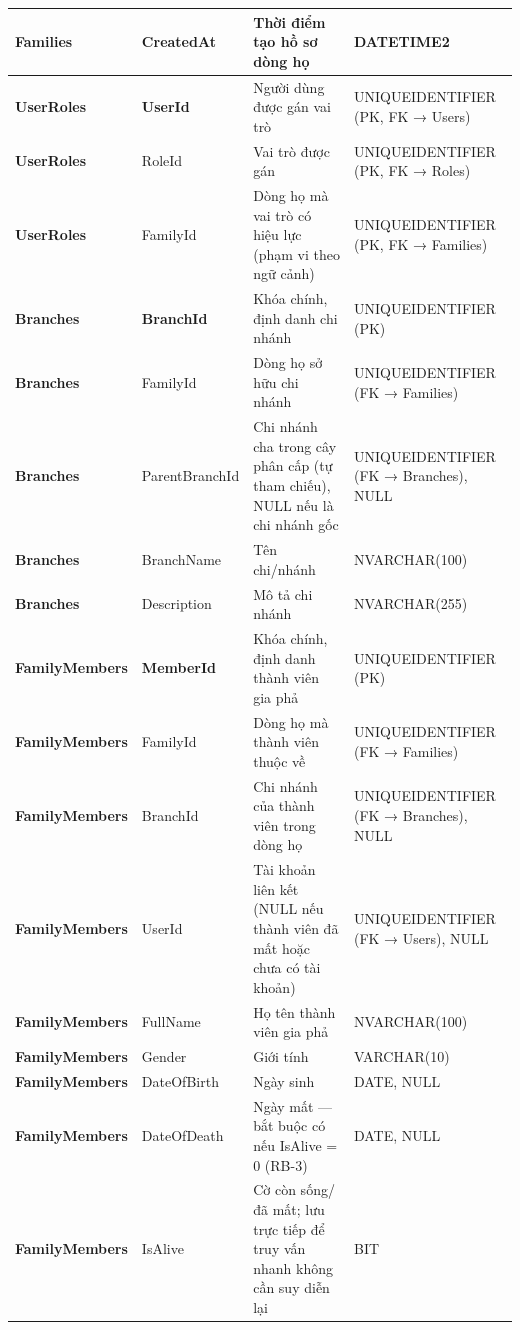 \begin{longtable}{|p{}|p{}|p{}|p{}|}
\textbf{Families} & CreatedAt & Thời điểm tạo hồ sơ dòng họ & DATETIME2 \\ \hline
\textbf{UserRoles} & \textbf{UserId} & Người dùng được gán vai trò & UNIQUEIDENTIFIER (PK, FK → Users) \\ \hline
\textbf{UserRoles} & RoleId & Vai trò được gán & UNIQUEIDENTIFIER (PK, FK → Roles) \\ \hline
\textbf{UserRoles} & FamilyId & Dòng họ mà vai trò có hiệu lực (phạm vi theo ngữ cảnh) & UNIQUEIDENTIFIER (PK, FK → Families) \\ \hline
\textbf{Branches} & \textbf{BranchId} & Khóa chính, định danh chi nhánh & UNIQUEIDENTIFIER (PK) \\ \hline
\textbf{Branches} & FamilyId & Dòng họ sở hữu chi nhánh & UNIQUEIDENTIFIER (FK → Families) \\ \hline
\textbf{Branches} & ParentBranchId & Chi nhánh cha trong cây phân cấp (tự tham chiếu), NULL nếu là chi nhánh gốc & UNIQUEIDENTIFIER (FK → Branches), NULL \\ \hline
\textbf{Branches} & BranchName & Tên chi/nhánh & NVARCHAR(100) \\ \hline
\textbf{Branches} & Description & Mô tả chi nhánh & NVARCHAR(255) \\ \hline
\textbf{FamilyMembers} & \textbf{MemberId} & Khóa chính, định danh thành viên gia phả & UNIQUEIDENTIFIER (PK) \\ \hline
\textbf{FamilyMembers} & FamilyId & Dòng họ mà thành viên thuộc về & UNIQUEIDENTIFIER (FK → Families) \\ \hline
\textbf{FamilyMembers} & BranchId & Chi nhánh của thành viên trong dòng họ & UNIQUEIDENTIFIER (FK → Branches), NULL \\ \hline
\textbf{FamilyMembers} & UserId & Tài khoản liên kết (NULL nếu thành viên đã mất hoặc chưa có tài khoản) & UNIQUEIDENTIFIER (FK → Users), NULL \\ \hline
\textbf{FamilyMembers} & FullName & Họ tên thành viên gia phả & NVARCHAR(100) \\ \hline
\textbf{FamilyMembers} & Gender & Giới tính & VARCHAR(10) \\ \hline
\textbf{FamilyMembers} & DateOfBirth & Ngày sinh & DATE, NULL \\ \hline
\textbf{FamilyMembers} & DateOfDeath & Ngày mất — bắt buộc có nếu IsAlive = 0 (RB-3) & DATE, NULL \\ \hline
\textbf{FamilyMembers} & IsAlive & Cờ còn sống/đã mất; lưu trực tiếp để truy vấn nhanh không cần suy diễn lại & BIT \\ \hline

\end{longtable}
